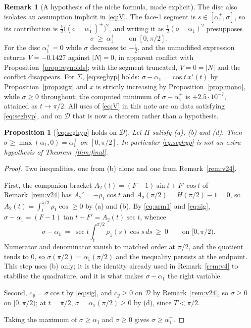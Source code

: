 \documentclass[11pt]{article}
\newtheorem{proposition}[theorem]{Proposition}
\theoremstyle{definition}
\newtheorem{remark}[theorem]{Remark}
\newcommand{\Sig}{\Sigma}
\begin{document}
\begin{remark}[A hypothesis of the niche formula, made explicit]\label{rem:seghyp}
The disc also isolates an assumption implicit in \eqref{eq:V}. The face-1 segment is
$s\in[\alpha_1^+,\sigma]$, so its contribution is $\tfrac12\bigl((\sigma-\alpha_1^+)^+
\bigr)^2$, and writing it as $\tfrac12(\sigma-\alpha_1)^2$ presupposes
\begin{equation}\label{eq:seghyp}
  \sigma\ \ge\ \alpha_1^+ \qquad\text{on }[0,\pi/2].
\end{equation}
For the disc $\alpha_1^+=0$ while $\sigma$ decreases to $-\tfrac12$, and the unmodified
expression returns $V=-0.1427$ against $|N|=0$, in apparent conflict with
Proposition~\ref{prop:reynolds}; with the segment truncated, $V=0=|N|$ and the conflict
disappears. For $\Sig$, \eqref{eq:seghyp} holds: $\sigma-\alpha_1=\cos t\,x'(t)$ by
Proposition~\ref{prop:sigx} and $x$ is strictly increasing by
Proposition~\ref{prop:mono}, while $\sigma\ge0$ throughout; the computed minimum of
$\sigma-\alpha_1^+$ is $+2.5\cdot10^{-7}$, attained as $t\to\pi/2$. All uses of
\eqref{eq:V} in this note are on data satisfying \eqref{eq:seghyp}, and on $\mathcal D$ that
is now a theorem rather than a hypothesis.
\end{remark}

\begin{proposition}[\eqref{eq:seghyp} holds on $\mathcal D$]\label{prop:seghyp}
Let $H$ satisfy (a), (b) and (d). Then $\sigma\ge\max(\alpha_1,0)=\alpha_1^+$ on
$[0,\pi/2]$. In particular \eqref{eq:seghyp} is not an extra hypothesis of
Theorem~\ref{thm:final}.
\end{proposition}

\begin{proof}
Two inequalities, one from (b) alone and one from Remark~\ref{rem:v24}.

First, the companion bracket $A_2(t)=(F-1)\sin t+F'\cos t$ of Remark~\ref{rem:v24} has
$A_2'=-\rho_1\cos t$ and $A_2(\pi/2)=H(\pi/2)-1=0$, so
$A_2(t)=\int_t^{\pi/2}\rho_1\cos\ge0$ by (a) and (b). By \eqref{eq:arm1} and \eqref{eq:sig},
$\sigma-\alpha_1=(F-1)\tan t+F'=A_2(t)\sec t$, whence
\[
  \sigma-\alpha_1\ =\ \sec t\int_t^{\pi/2}\rho_1(s)\cos s\,ds\ \ge\ 0
  \qquad\text{on }[0,\pi/2) .
\]
Numerator and denominator vanish to matched order at $\pi/2$, and the quotient tends to $0$,
so $\sigma(\pi/2)=\alpha_1(\pi/2)$ and the inequality persists at the endpoint. This step
uses (b) only; it is the identity already used in Remark~\ref{rem:v4} to stabilise the
quadrature, and it is what makes $\sigma-\alpha_1$ the right variable.

Second, $c_y=\sigma\cos t$ by \eqref{eq:sig}, and $c_y\ge0$ on $\mathcal D$ by
Remark~\ref{rem:v24}, so $\sigma\ge0$ on $[0,\pi/2)$; at $t=\pi/2$,
$\sigma=\alpha_1(\pi/2)\ge0$ by (d), since $T<\pi/2$.

Taking the maximum of $\sigma\ge\alpha_1$ and $\sigma\ge0$ gives $\sigma\ge\alpha_1^+$.
\end{proof}
\end{document}
